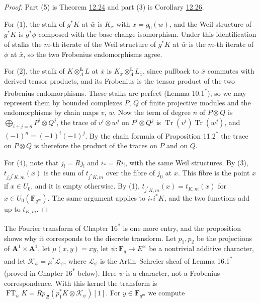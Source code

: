 \documentclass[11pt]{article}
\newcommand{\bpout}[1]{#1\textsuperscript{\hyperlink{bp-outside}{\ensuremath{\ast}}}}
\begin{document}
\begin{proof}[{Proof}]\label{bp85}%
Part (5) is Theorem \hyperref[bp73]{12.24} and part (3) is Corollary \hyperref[bp80]{12.26}.

For (1), the stalk of \(g^*K\) at \(\bar w\) is \(K_{\bar x}\) with \(x=g_0(w)\), and the Weil structure of \(g^*K\) is \(g^*\phi\) composed with the base change isomorphism. Under this identification of stalks the \(m\)-th iterate of the Weil structure of \(g^*K\) at \(\bar w\) is the \(m\)-th iterate of \(\phi\) at \(\bar x\), so the two Frobenius endomorphisms agree.

For (2), the stalk of \(K\otimes^{\mathbf L}_\Lambda L\) at \(\bar x\) is \(K_{\bar x}\otimes^{\mathbf L}_\Lambda L_{\bar x}\), since pullback to \(\bar x\) commutes with derived tensor products, and its Frobenius is the tensor product of the two Frobenius endomorphisms. These stalks are perfect (Lemma \bpout{10.1}), so we may represent them by bounded complexes \(P\), \(Q\) of finite projective modules and the endomorphisms by chain maps \(v\), \(w\). Now the term of degree \(n\) of \(P\otimes Q\) is \(\bigoplus_{i+j=n}P^i\otimes Q^j\), the trace of \(v^i\otimes w^j\) on \(P^i\otimes Q^j\) is \(\operatorname{Tr}(v^i)\operatorname{Tr}(w^j)\), and \((-1)^n=(-1)^i(-1)^j\). By the chain formula of Proposition \bpout{11.2} the trace on \(P\otimes Q\) is therefore the product of the traces on \(P\) and on \(Q\).

For (4), note that \(j_!=Rj_!\) and \(i_*=Ri_!\), with the same Weil structures. By (3), \(t_{j_!j^*K,m}(x)\) is the sum of \(t_{j^*K,m}\) over the fibre of \(j_0\) at \(x\). This fibre is the point \(x\) if \(x\in U_0\), and it is empty otherwise. By (1), \(t_{j^*K,m}(x)=t_{K,m}(x)\) for \(x\in U_0(\mathbf F_{q^m})\). The same argument applies to \(i_*i^*K\), and the two functions add up to \(t_{K,m}\).
\end{proof}

\label{bp86}%
The Fourier transform of Chapter \bpout{16} is one more entry, and the proposition shows why it corresponds to the discrete transform. Let \(p_1,p_2\) be the projections of \(\mathbf A^1\times\mathbf A^1\), let \(\mu(x,y)=xy\), let \(\psi:\mathbf F_q\to E^\times\) be a nontrivial additive character, and let \(\mathcal K_\psi=\mu^*\mathcal L_\psi\), where \(\mathcal L_\psi\) is the Artin–Schreier sheaf of Lemma \bpout{16.1} (proved in Chapter \bpout{16} below). Here \(\psi\) is a character, not a Frobenius correspondence. With this kernel the transform is \(\operatorname{FT}_\psi K=Rp_{2!}(p_1^*K\otimes\mathcal K_\psi)[1]\). For \(y\in\mathbf F_{q^m}\) we compute
\end{document}
